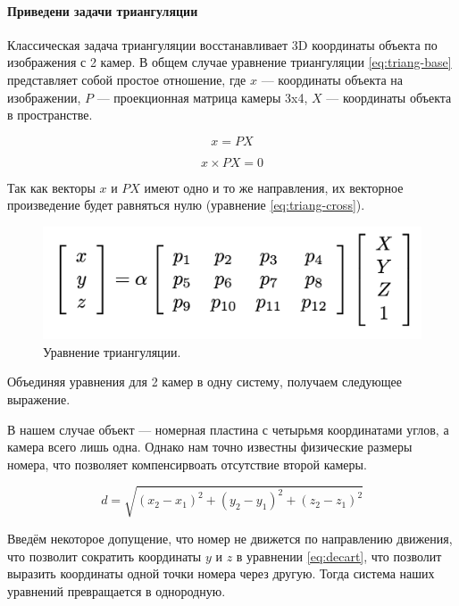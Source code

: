 \documentclass[specification,annotation,times]{itmo-student-thesis}
\begin{document}
	\paragraph{Приведени задачи триангуляции}
	Классическая задача триангуляции \cite{845377} восстанавливает 3D координаты \cite{inproceedings} объекта по изображения с 2 камер. В общем случае уравнение триангуляции \ref{eq:triang-base} представляет собой простое отношение, где $ x $ --- координаты объекта на изображении, $ P $ --- проекционная матрица камеры 3x4, $ X $ --- координаты объекта в пространстве. 
	
	\begin{equation}
	\mathit{ x=PX }
	\label{eq:triang-base}
	\end{equation}
	
	\begin{equation}
	\mathit{ x \times PX=0 }
	\label{eq:triang-cross}
	\end{equation}
	
	Так как векторы $ x $ и $ PX $ имеют одно и то же направления, их векторное произведение будет равняться нулю (уравнение \ref{eq:triang-cross}). 
	
	\begin{figure}[!ht]
		\caption{Уравнение триангуляции.}\label{img:eq}
		\includegraphics[width=0.85\linewidth]{../png/eq.png}
		\centering
	\end{figure}
	Объединяя уравнения  для 2 камер в одну систему, получаем следующее выражение.
	
	В нашем случае объект --- номерная пластина с четырьмя координатами углов, а камера всего лишь одна. Однако нам точно известны физические размеры номера, что позволяет компенсирвоать отсутствие второй камеры. 
	
	\begin{equation}
	\mathit{ d=\sqrt{ 	(x_{2}-x_{1})^{2}   +   (y_{2}-y_{1})^{2}   +   (z_{2}-z_{1})^{2} }  }
	\label{eq:decart}
	\end{equation}
	
	Введём некоторое допущение, что номер не движется по направлению движения, что позволит сократить координаты $ y $ и $ z $ в уравнении \ref{eq:decart}, что позволит выразить координаты одной точки номера через другую. Тогда система наших уравнений превращается в однородную.
	
\end{document}
